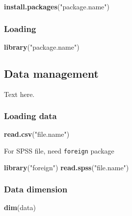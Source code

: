\documentclass[]{book}
\newenvironment{Shaded}{\begin{snugshade}}{\end{snugshade}}
\newcommand{\KeywordTok}[1]{\textcolor[rgb]{0.13,0.29,0.53}{\textbf{#1}}}
\newcommand{\StringTok}[1]{\textcolor[rgb]{0.31,0.60,0.02}{#1}}
\newcommand{\NormalTok}[1]{#1}
\theoremstyle{definition}
\theoremstyle{definition}
\theoremstyle{remark}
\begin{document}
\begin{Shaded}
\begin{Highlighting}[]
\KeywordTok{install.packages}\NormalTok{(}\StringTok{"package.name"}\NormalTok{)}
\end{Highlighting}
\end{Shaded}

\subsubsection{Loading}\label{loading}

\begin{Shaded}
\begin{Highlighting}[]
\KeywordTok{library}\NormalTok{(}\StringTok{"package.name"}\NormalTok{)}
\end{Highlighting}
\end{Shaded}

\subsection{Data management}\label{data-management}

Text here.

\subsubsection{Loading data}\label{loading-data}

\begin{Shaded}
\begin{Highlighting}[]
\KeywordTok{read.csv}\NormalTok{(}\StringTok{"file.name"}\NormalTok{)}
\end{Highlighting}
\end{Shaded}

For SPSS file, need \texttt{foreign} package

\begin{Shaded}
\begin{Highlighting}[]
\KeywordTok{library}\NormalTok{(}\StringTok{"foreign"}\NormalTok{)}
\KeywordTok{read.spss}\NormalTok{(}\StringTok{"file.name"}\NormalTok{)}
\end{Highlighting}
\end{Shaded}

\subsubsection{Data dimension}\label{data-dimension}

\begin{Shaded}
\begin{Highlighting}[]
\KeywordTok{dim}\NormalTok{(data)}
\end{Highlighting}
\end{Shaded}
\end{document}
